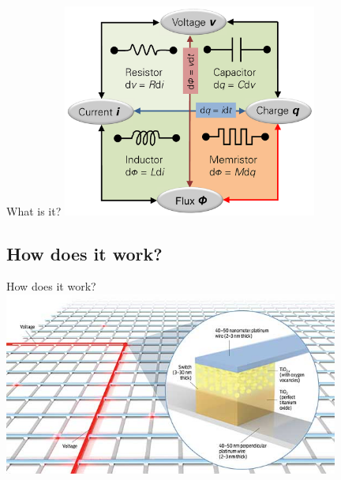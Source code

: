 \documentclass{beamer}
\begin{document}

\begin{frame}{What is it?}
  \center
  \includegraphics[height=7cm]{Memristor.png}
\end{frame}

\subsection{How does it work?}

\begin{frame}{How does it work?}
  \includegraphics[height=6cm]{memristor01.jpg}
\end{frame}
\end{document}
